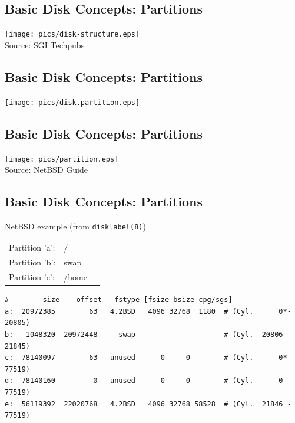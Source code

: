 \documentclass[xga]{xdvislides}
\begin{document}
\subsection{Basic Disk Concepts: Partitions}
	\begin{center}
		\texttt{[image: pics/disk-structure.eps]} \\
		\tiny Source: SGI Techpubs \\
	\end{center}

\subsection{Basic Disk Concepts: Partitions}
	\begin{center}
		\texttt{[image: pics/disk.partition.eps]}
	\end{center}


\subsection{Basic Disk Concepts: Partitions}
	\begin{center}
		\texttt{[image: pics/partition.eps]} \\
		\tiny Source: NetBSD Guide \\
	\end{center}

\subsection{Basic Disk Concepts: Partitions}
NetBSD example (from {\tt disklabel(8)})

\begin{tabular}{ l l c }
Partition 'a': & / & \\
Partition 'b': & swap & \\
Partition 'e': & /home & \\
\end{tabular}

\begin{verbatim}
#        size    offset   fstype [fsize bsize cpg/sgs]
a:  20972385        63   4.2BSD   4096 32768  1180  # (Cyl.      0*- 20805)
b:   1048320  20972448     swap                     # (Cyl.  20806 - 21845)
c:  78140097        63   unused      0     0        # (Cyl.      0*- 77519)
d:  78140160         0   unused      0     0        # (Cyl.      0 - 77519)
e:  56119392  22020768   4.2BSD   4096 32768 58528  # (Cyl.  21846 - 77519)
\end{verbatim}
\end{document}
